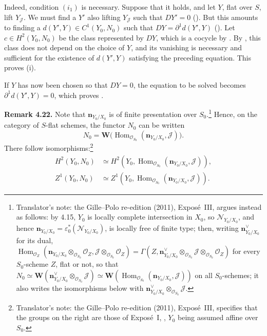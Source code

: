 Indeed, condition \((i_1)\) is necessary. Suppose that it holds, and let
\(Y\), flat over \(S\), lift \(Y_{\mathscr J}\). We must find a
\(Y'\) also lifting \(Y_{\mathscr J}\) such that \(DY'=0\)
(). But this amounts to finding a
\(d(Y',Y)\in C^1(Y_0,N_0)\) such that \(DY=\partial^1d(Y',Y)\)
().
Let \(c\in H^2(Y_0,N_0)\) be the class represented by \(DY\),
which is a cocycle by . By , this class does not depend
on the choice of \(Y\), and its vanishing is necessary and sufficient
for the existence of \(d(Y',Y)\) satisfying the preceding equation.
This proves (i).

If \(Y\) has now been chosen so that \(DY=0\), the equation to
be solved becomes \(\partial^1d(Y',Y)=0\), which proves .

\medskip
\noindent{}\textbf{Remark 4.22.}
Note that \(\mathbf n_{Y_0/X_0}\) is of finite presentation over
\(S_0\).\footnote{Translator's note: the Gille--Polo re-edition (2011), Exposé~III, argues instead as
follows: by 4.15, \(Y_0\) is locally complete intersection in \(X_0\), so
\(\mathscr N_{Y_0/X_0}\), and hence \(\mathbf n_{Y_0/X_0}=\varepsilon_0^*
(\mathscr N_{Y_0/X_0})\), is locally free of finite type; then, writing
\(\mathbf n^\vee_{Y_0/X_0}\) for its dual,
\(\operatorname{Hom}_{\mathscr O_Z}(\mathbf n_{Y_0/X_0}\otimes_{\mathscr O_{S_0}}
\mathscr O_Z,\mathscr J\otimes_{\mathscr O_{S_0}}\mathscr O_Z)=\Gamma(Z,
\mathbf n^\vee_{Y_0/X_0}\otimes_{\mathscr O_{S_0}}\mathscr J\otimes_{\mathscr O_{S_0}}
\mathscr O_Z)\) for every \(S_0\)-scheme \(Z\), flat or not, so that
\(N_0\simeq\mathbf W(\mathbf n^\vee_{Y_0/X_0}\otimes_{\mathscr O_{S_0}}\mathscr J)
\simeq\mathbf W(\operatorname{Hom}_{\mathscr O_{S_0}}(\mathbf n_{Y_0/X_0},
\mathscr J))\) on all \(S_0\)-schemes; it also writes the isomorphisms below
with \(\mathbf n^\vee_{Y_0/X_0}\otimes_{\mathscr O_{S_0}}\mathscr J\).} Hence, on
the category of \(S\)-flat schemes, the functor \(N_0\) can be written
\[
 N_0=\mathbf W\bigl(
  \operatorname{Hom}_{\mathscr O_{S_0}}
  (\mathbf n_{Y_0/X_0},\mathscr J)\bigr).
\]
There follow isomorphisms:\footnote{Translator's note: the Gille--Polo re-edition (2011), Exposé~III, specifies that
the groups on the right are those of Exposé~I, , \(Y_0\) being
assumed affine over \(S_0\).}
\[
 \begin{aligned}
 H^2(Y_0,N_0)
 &\simeq H^2\!\left(
   Y_0,\operatorname{Hom}_{\mathscr O_{S_0}}
   (\mathbf n_{Y_0/X_0},\mathscr J)\right),\\
 Z^1(Y_0,N_0)
 &\simeq Z^1\!\left(
   Y_0,\operatorname{Hom}_{\mathscr O_{S_0}}
   (\mathbf n_{Y_0/X_0},\mathscr J)\right).
 \end{aligned}
\]
